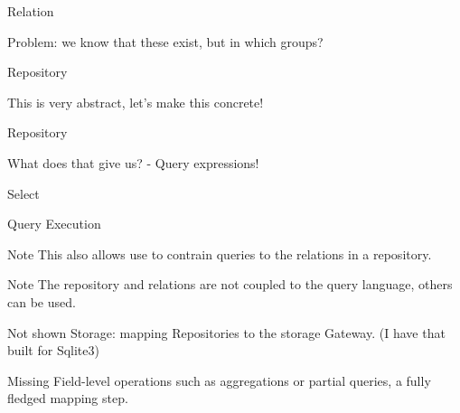 \documentclass{beamer}
\begin{document}
\begin{frame}{Relation}
\end{frame}

\begin{frame}
  Problem: we know that these exist, but in which groups?
\end{frame}

\begin{frame}{Repository}
\end{frame}

\begin{frame}
  This is very abstract, let's make this concrete!
\end{frame}

\begin{frame}{Repository}
\end{frame}

\begin{frame}{}
  What does that give us? - Query expressions!
\end{frame}

\begin{frame}{Select}
\end{frame}

\begin{frame}{Query Execution}
\end{frame}

\begin{frame}{Note}
  This also allows use to contrain queries to the relations in a repository. 
\end{frame}

\begin{frame}{Note}
  The repository and relations are not coupled to the query language, others can be used.
\end{frame}


\begin{frame}{Not shown}
  Storage: mapping Repositories to the storage Gateway. (I have that built for Sqlite3)
\end{frame}

\begin{frame}{Missing}
  Field-level operations such as aggregations or partial queries, a fully fledged mapping step.
\end{frame}
\end{document}
